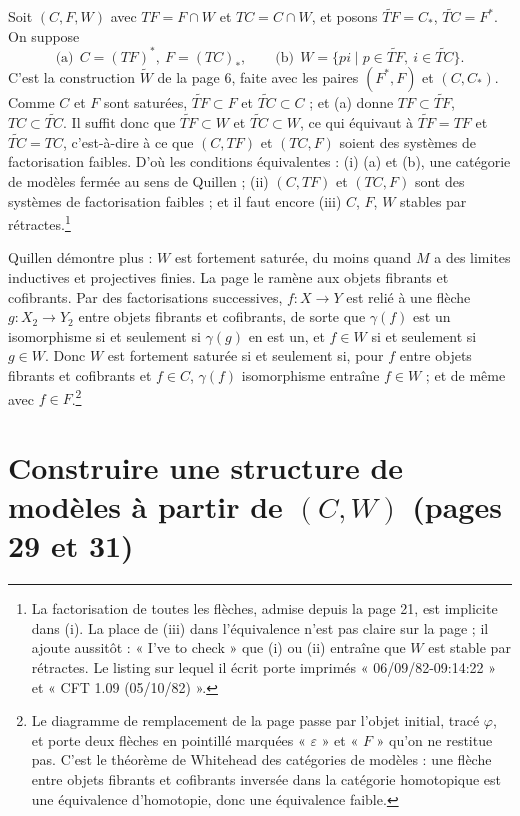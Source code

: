 \documentclass[11pt,a4paper]{article}
\begin{document}
Soit $(C, F, W)$ avec $TF = F \cap W$ et $TC = C \cap W$, et posons
$\widetilde{TF} = C_*$, $\widetilde{TC} = F^*$. On suppose
\[
\text{(a)} \ \ C = (TF)^*, \ F = (TC)_*, \qquad
\text{(b)} \ \ W = \{ pi \mid p \in \widetilde{TF},\ i \in \widetilde{TC} \}.
\]
C'est la construction $\widetilde W$ de la page 6, faite avec les paires
$(F^*, F)$ et $(C, C_*)$. Comme $C$ et $F$ sont saturées, $\widetilde{TF}
\subset F$ et $\widetilde{TC} \subset C$ ; et (a) donne $TF \subset
\widetilde{TF}$, $TC \subset \widetilde{TC}$. Il suffit donc que
$\widetilde{TF} \subset W$ et $\widetilde{TC} \subset W$, ce qui équivaut à
$\widetilde{TF} = TF$ et $\widetilde{TC} = TC$, c'est-à-dire à ce que
$(C, TF)$ et $(TC, F)$ soient des systèmes de factorisation faibles. D'où les
conditions équivalentes : (i) (a) et (b), une catégorie de modèles fermée au sens
de Quillen ; (ii) $(C, TF)$ et $(TC, F)$ sont des systèmes de factorisation
faibles ; et il faut encore (iii) $C$, $F$, $W$ stables par
rétractes.\footnote{La factorisation de toutes les flèches, admise depuis la
page 21, est implicite dans (i). La place de (iii) dans l'équivalence n'est
pas claire sur la page ; il ajoute aussitôt : « I've to check » que (i) ou (ii)
entraîne que $W$ est stable par rétractes. Le listing sur lequel il écrit
porte imprimés « 06/09/82-09:14:22 » et « CFT 1.09 (05/10/82) ».}

Quillen démontre plus : $W$ est fortement saturée, du moins quand $M$ a des
limites inductives et projectives finies. La page le ramène aux objets
fibrants et cofibrants. Par des factorisations successives, $f : X \to Y$ est
relié à une flèche $g : X_2 \to Y_2$ entre objets fibrants et cofibrants, de
sorte que $\gamma(f)$ est un isomorphisme si et seulement si $\gamma(g)$ en
est un, et $f \in W$ si et seulement si $g \in W$. Donc $W$ est fortement
saturée si et seulement si, pour $f$ entre objets fibrants et cofibrants et
$f \in C$, $\gamma(f)$ isomorphisme entraîne $f \in W$ ; et de même avec $f \in
F$.\footnote{Le diagramme de remplacement de la page passe par l'objet
initial, tracé $\varphi$, et porte deux flèches en pointillé marquées
« $\varepsilon$ » et « $F$ » qu'on ne restitue pas. C'est le théorème de
Whitehead des catégories de modèles : une flèche entre objets fibrants et
cofibrants inversée dans la catégorie homotopique est une équivalence
d'homotopie, donc une équivalence faible.}

\section*{Construire une structure de modèles à partir de $(C, W)$ (pages 29 et 31)}
\end{document}
